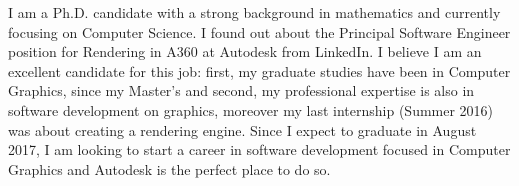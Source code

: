 \documentclass[10pt,stdletter,dateno,sigleft,letterpaper]{newlfm} %
\begin{document}
\begin{newlfm}



I am a Ph.D. candidate with a strong background in mathematics and currently focusing on Computer Science. I found out about the Principal Software Engineer position for Rendering in A360 at Autodesk from LinkedIn. I believe I am an excellent candidate for this job: first, my graduate studies have been in Computer Graphics, since my Master's and second, my professional expertise is also in software development on graphics, moreover my last internship (Summer 2016) was about creating a rendering engine. Since I expect to graduate in August 2017, I am looking to start a career in software development focused in Computer Graphics and Autodesk is the perfect place to do so.



\end{newlfm}
\end{document}
